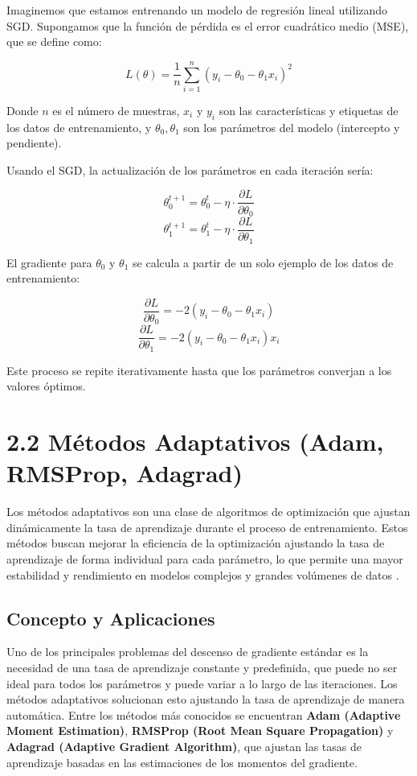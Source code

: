 \documentclass[12pt]{article}
\begin{document}
	Imaginemos que estamos entrenando un modelo de regresión lineal utilizando SGD. Supongamos que la función de pérdida es el error cuadrático medio (MSE), que se define como:
	
	\[
	L(\theta) = \frac{1}{n} \sum_{i=1}^{n} (y_i - \theta_0 - \theta_1 x_i)^2
	\]
	
	Donde \( n \) es el número de muestras, \( x_i \) y \( y_i \) son las características y etiquetas de los datos de entrenamiento, y \( \theta_0, \theta_1 \) son los parámetros del modelo (intercepto y pendiente).
	
	Usando el SGD, la actualización de los parámetros en cada iteración sería:
	
	\[
	\theta_0^{t+1} = \theta_0^t - \eta \cdot \frac{\partial L}{\partial \theta_0}
	\]
	\[
	\theta_1^{t+1} = \theta_1^t - \eta \cdot \frac{\partial L}{\partial \theta_1}
	\]
	
	El gradiente para \( \theta_0 \) y \( \theta_1 \) se calcula a partir de un solo ejemplo de los datos de entrenamiento:
	
	\[
	\frac{\partial L}{\partial \theta_0} = -2 (y_i - \theta_0 - \theta_1 x_i)
	\]
	\[
	\frac{\partial L}{\partial \theta_1} = -2 (y_i - \theta_0 - \theta_1 x_i) x_i
	\]
	
	Este proceso se repite iterativamente hasta que los parámetros converjan a los valores óptimos.
	
	\section*{2.2 Métodos Adaptativos (Adam, RMSProp, Adagrad)}
	
	Los métodos adaptativos son una clase de algoritmos de optimización que ajustan dinámicamente la tasa de aprendizaje durante el proceso de entrenamiento. Estos métodos buscan mejorar la eficiencia de la optimización ajustando la tasa de aprendizaje de forma individual para cada parámetro, lo que permite una mayor estabilidad y rendimiento en modelos complejos y grandes volúmenes de datos \cite{Kingma2015}.
	
	\subsection*{Concepto y Aplicaciones}
	
	Uno de los principales problemas del descenso de gradiente estándar es la necesidad de una tasa de aprendizaje constante y predefinida, que puede no ser ideal para todos los parámetros y puede variar a lo largo de las iteraciones. Los métodos adaptativos solucionan esto ajustando la tasa de aprendizaje de manera automática. Entre los métodos más conocidos se encuentran \textbf{Adam (Adaptive Moment Estimation)}, \textbf{RMSProp (Root Mean Square Propagation)} y \textbf{Adagrad (Adaptive Gradient Algorithm)}, que ajustan las tasas de aprendizaje basadas en las estimaciones de los momentos del gradiente.
	
\end{document}
